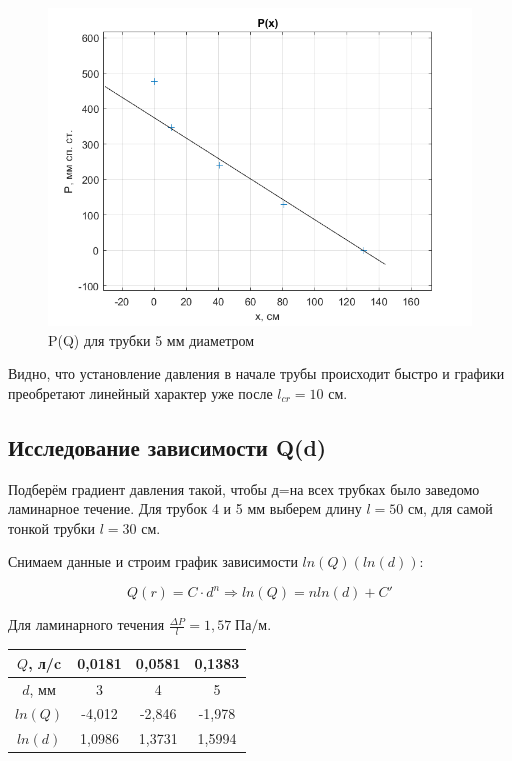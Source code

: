 \documentclass[a4paper, 12pt]{article} %
\begin{document}
\begin{figure}[!h]
    \centering
    \includegraphics[width = 11 cm]{pl5}
    \caption{P(Q) для трубки 5 мм диаметром}
    \label{fig:vac}
\end{figure}
\newpage

Видно, что установление давления в начале трубы происходит быстро и графики преобретают линейный характер уже после $l_{cr} = 10$ см.

\subsection{Исследование зависимости Q(d)}

Подберём градиент давления такой, чтобы д=на всех трубках было заведомо ламинарное течение. Для трубок 4 и 5 мм выберем длину $l = 50$ см, для самой тонкой трубки $l = 30$ см.

Снимаем данные и строим график зависимости $ln(Q)(ln(d))$:

\begin{equation}
	Q(r) = C \cdot d^n \Rightarrow ln(Q) = nln(d) + C'
\end{equation}

Для ламинарного течения $\frac{\Delta P}{l}  = 1,57 \; \text{Па/м}$.

\begin{center}
\begin{tabular}{|c|c|c|c|}
\hline
$Q$, л/c & 0,0181  & 0,0581  & 0,1383  \\ \hline
$d$, мм  & 3      & 4      & 5      \\ \hline
$ln(Q)$  & -4,012 & -2,846 & -1,978 \\ \hline
$ln(d)$  & 1,0986 & 1,3731 & 1,5994 \\ \hline
\end{tabular}
\end{center}
\end{document}
